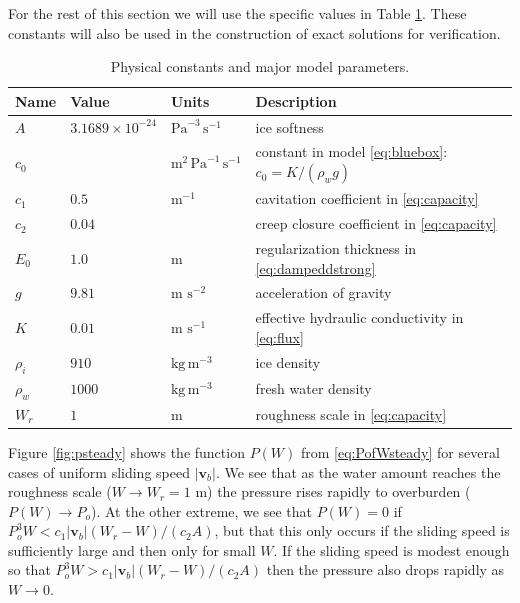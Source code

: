 \documentclass[11pt,final]{amsart}%
\newcommand\bv{\mathbf{v}}
\begin{document}
For the rest of this section we will use the specific values in Table \ref{tab:constants}.  These constants will also be used in the construction of exact solutions for verification.

\begin{table}[ht]
  \centering
  \caption{Physical constants and major model parameters.}
  \begin{tabular}{lllp{3.0in}} 
    \textbf{Name} & \textbf{Value} & \textbf{Units} & \textbf{Description}\\
\hline
    $A$ & $3.1689\times 10^{-24}$ & $\text{Pa}^{-3}\,\text{s}^{-1}$ & ice softness \citep{EISMINT96} \\
    $c_0$ &  & $\text{m}^{2}\,\text{Pa}^{-1}\,\text{s}^{-1}$ & constant in model \eqref{eq:bluebox}: $c_0=K/(\rho_w g)$ \\
    $c_1$ & $0.5$ & $\text{m}^{-1}$ & cavitation coefficient in \eqref{eq:capacity} \\
    $c_2$ & $0.04$ & & creep closure coefficient in \eqref{eq:capacity} \\
    $E_0$ & $1.0$ & m & regularization thickness in \eqref{eq:dampeddstrong} \\
    $g$ & $9.81$ & m $\text{s}^{-2}$ & acceleration of gravity \\
    $K$ & $0.01$ & m $\text{s}^{-1}$ & effective hydraulic conductivity in \eqref{eq:flux} \\ %
    $\rho_i$ & $910$ & $\text{kg}\,\text{m}^{-3}$ & ice density \citep{GreveBlatter2009} \\
    $\rho_w$ & $1000$ & $\text{kg}\,\text{m}^{-3}$ & fresh water density \citep{GreveBlatter2009} \\
    $W_r$ & $1$ & $\text{m}$ & roughness scale in \eqref{eq:capacity} \\
    \hline
  \end{tabular}
 \label{tab:constants}
\end{table}

Figure \ref{fig:psteady} shows the function $P(W)$ from \eqref{eq:PofWsteady} for several cases of uniform sliding speed $|\bv_b|$.  We see that as the water amount reaches the roughness scale ($W\to W_r=1$ m) the pressure rises rapidly to overburden ($P(W) \to P_o$).  At the other extreme, we see that $P(W)=0$ if $P_o^3 W < c_1 |\bv_b| (W_r - W) / (c_2 A)$, but that this only occurs if the sliding speed is sufficiently large and then only for small $W$.  If the sliding speed is modest enough so that $P_o^3 W > c_1 |\bv_b| (W_r - W) / (c_2 A)$ then the pressure also drops rapidly as $W\to 0$.
\end{document}
